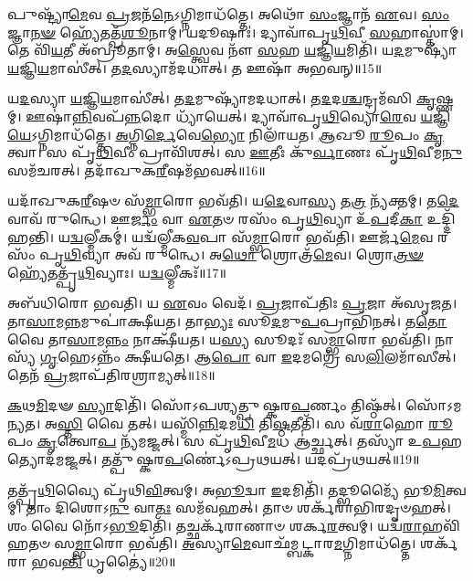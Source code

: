 𑌪𑍁𑌷𑍍𑌟𑍍𑌯𑌾᳴\-\ul{𑌮𑍇}\-𑌵 \ul{𑌪𑍍𑌰}\-𑌜𑌨᳴\-\ul{𑌨𑍇}\-\-𑌽𑌗𑍍𑌨𑌿𑌮𑌾𑌧᳴𑌤𑍍𑌤𑍇।
𑌅𑌥𑍋᳴ \ul{𑌸𑌂}\-𑌜𑍍𑌞𑌾𑌨᳴ \ul{𑌏}\-𑌵।
\-\ul{𑌸𑌂}\-𑌜𑍍𑌞𑌾\-\ul{𑌨}\-\-\ul{𑍟} 𑌹𑍍𑌯𑍇᳴𑌤𑌤𑍍𑌪᳴\-\ul{𑌶𑍂}\-𑌨𑌾𑌮𑍍।
𑌯𑌦𑍂𑌷𑌾𑌃॑।
𑌦𑍍𑌯𑌾𑌵𑌾᳴𑌪𑍃\-\ul{𑌥𑌿}\-𑌵𑍀 \ul{𑌸}\-𑌹𑌾𑌸𑍍𑌤𑌾॑𑌮𑍍।
𑌤𑍇 𑌵𑌿᳴\-\ul{𑌯}\-𑌤𑍀 𑌅᳴𑌬𑍍𑌰𑍂𑌤𑌾𑌮𑍍।
𑌅\-\ul{𑌸𑍍𑌤𑍍𑌵𑍇}\-𑌵 𑌨𑍗᳴ \ul{𑌸}\-𑌹 \ul{𑌯}\-𑌜𑍍𑌞𑌿\-\ul{𑌯}\-𑌮𑌿𑌤𑌿᳴।
𑌯\-\ul{𑌦}\-𑌮𑍁𑌷𑍍𑌯𑌾᳴ \ul{𑌯}\-𑌜𑍍𑌞𑌿\-\ul{𑌯}\-𑌮𑌾𑌸𑍀॑𑌤𑍍।
𑌤\-\ul{𑌦}\-𑌸𑍍𑌯𑌾𑌮᳴𑌦𑌧𑌾𑌤𑍍।
𑌤 𑌊𑌷𑌾᳴ 𑌅𑌭𑌵𑌨𑍍॥15॥

𑌯\-\ul{𑌦}\-𑌸𑍍𑌯𑌾 \ul{𑌯}\-𑌜𑍍𑌞𑌿\-\ul{𑌯}\-𑌮𑌾𑌸𑍀॑𑌤𑍍।
𑌤\-\ul{𑌦}\-𑌮𑍁𑌷𑍍𑌯𑌾᳴𑌮𑌦𑌧𑌾𑌤𑍍।
𑌤\-\ul{𑌦}\-𑌦\-\ul{𑌶𑍍𑌚}\-𑌨𑍍𑌦𑍍𑌰𑌮᳴𑌸𑌿 \ul{𑌕𑍃}\-𑌷𑍍𑌣𑌮𑍍।
𑌊𑌷𑌾॑\-\ul{𑌨𑍍𑌨𑌿}\-𑌵𑌪᳴\-\ul{𑌨𑍍𑌨}\-𑌦𑍋 𑌧𑍍𑌯𑌾᳴𑌯𑍇𑌤𑍍।
𑌦𑍍𑌯𑌾𑌵𑌾᳴𑌪𑍃\-\ul{𑌥𑌿}\-𑌵𑍍𑌯𑍋\-\ul{𑌰𑍇}\-𑌵 \ul{𑌯}\-𑌜𑍍𑌞𑌿\-\ul{𑌯𑍇}\-\-𑌽𑌗𑍍𑌨𑌿𑌮𑌾𑌧᳴𑌤𑍍𑌤𑍇।
\-\ul{𑌅}\-𑌗𑍍𑌨𑌿\-\ul{𑌰𑍍𑌦𑍇}\-𑌵𑍇\-\ul{𑌭𑍍𑌯𑍋} 𑌨𑌿𑌲𑌾᳴𑌯𑌤।
\-\ul{𑌆}\-𑌖𑍂 \ul{𑌰𑍂}\-𑌪𑌂 \ul{𑌕𑍃}\-𑌤𑍍𑌵𑌾।
𑌸 𑌪𑍃᳴\-\ul{𑌥𑌿}\-𑌵𑍀𑌂 𑌪𑍍𑌰𑌾𑌵𑌿᳴𑌶𑌤𑍍।
𑌸 \ul{𑌊}\-𑌤𑍀𑌃 𑌕𑍁᳴\-\ul{𑌰𑍍𑌵𑌾}\-𑌣𑌃 𑌪𑍃᳴\-\ul{𑌥𑌿}\-𑌵𑍀𑌮\-\ul{𑌨𑍁} 𑌸𑌮᳴𑌚𑌰𑌤𑍍।
𑌤𑌦𑌾᳴𑌖𑍁𑌕\-\ul{𑌰𑍀}\-𑌷𑌮᳴𑌭𑌵𑌤𑍍॥16॥

𑌯𑌦𑌾᳴𑌖𑍁𑌕\-\ul{𑌰𑍀}\-𑌷𑍞 𑌸᳴\-\ul{𑌮𑍍𑌭𑌾}\-𑌰𑍋 𑌭𑌵᳴𑌤𑌿।
𑌯\-\ul{𑌦𑍇}\-𑌵𑌾\-\ul{𑌸𑍍𑌯} 𑌤\-\ul{𑌤𑍍𑌰} 𑌨𑍍𑌯᳴𑌕𑍍𑌤𑌮𑍍।
𑌤\-\ul{𑌦𑍇}\-𑌵𑌾𑌵᳴ 𑌰𑍁𑌨𑍍𑌧𑍇।
𑌊\-\ul{𑌰𑍍𑌜𑌂} 𑌵𑌾 \ul{𑌏}\-𑌤𑍞 𑌰𑌸𑌂᳴ 𑌪𑍃\-\ul{𑌥𑌿}\-𑌵𑍍𑌯𑌾 𑌉᳴\-\ul{𑌪}\-𑌦𑍀\-\ul{𑌕𑌾} 𑌉𑌦𑍍𑌦𑌿᳴𑌹𑌨𑍍𑌤𑌿।
𑌯\-\ul{𑌦𑍍𑌵}\-𑌲𑍍𑌮𑍀𑌕𑌮𑍍॑।
𑌯𑌦𑍍𑌵᳴𑌲𑍍𑌮𑍀𑌕\-\ul{𑌵}\-𑌪𑌾 𑌸᳴\-\ul{𑌮𑍍𑌭𑌾}\-𑌰𑍋 𑌭𑌵᳴𑌤𑌿।
𑌊𑌰𑍍𑌜᳴\-\ul{𑌮𑍇}\-𑌵 𑌰𑌸𑌂᳴ 𑌪𑍃\-\ul{𑌥𑌿}\-𑌵𑍍𑌯𑌾 𑌅𑌵᳴ 𑌰𑍁𑌨𑍍𑌧𑍇।
𑌅\-\ul{𑌥𑍋} 𑌶𑍍𑌰𑍋𑌤𑍍𑌰᳴\-\ul{𑌮𑍇}\-𑌵।
𑌶𑍍𑌰𑍋\-\ul{𑌤𑍍𑌰}\-\-\ul{𑍟} 𑌹𑍍𑌯𑍇᳴𑌤𑌤𑍍𑌪𑍃᳴\-\ul{𑌥𑌿}\-𑌵𑍍𑌯𑌾𑌃।
𑌯\-\ul{𑌦𑍍𑌵}\-𑌲𑍍𑌮𑍀𑌕𑌃᳴॥17॥

𑌅𑌬᳴𑌧𑌿𑌰𑍋 𑌭𑌵𑌤𑌿।
𑌯 \ul{𑌏}\-𑌵𑌂 𑌵𑍇𑌦᳴।
\-\ul{𑌪𑍍𑌰}\-𑌜𑌾\-𑌪᳴𑌤𑌿𑌃 \ul{𑌪𑍍𑌰}\-𑌜𑌾 𑌅᳴\-𑌸𑍃𑌜𑌤।
𑌤𑌾\-\ul{𑌸𑌾}\-𑌮\-\ul{𑌨𑍍𑌨}\-𑌮𑍁𑌪𑌾॑𑌕𑍍𑌷𑍀𑌯𑌤।
𑌤𑌾\-\ul{𑌭𑍍𑌯𑌃} 𑌸𑍂\-\ul{𑌦}\-𑌮𑍁\-\ul{𑌪}\-𑌪𑍍𑌰𑌾𑌭𑌿᳴𑌨𑌤𑍍।
𑌤\-\ul{𑌤𑍋} 𑌵𑍈 𑌤𑌾\-\ul{𑌸𑌾}\-𑌮\-\ul{𑌨𑍍𑌨𑌂} 𑌨𑌾𑌕𑍍𑌷𑍀᳴𑌯𑌤।
𑌯\-\ul{𑌸𑍍𑌯} 𑌸𑍂𑌦𑌃᳴ 𑌸\-\ul{𑌮𑍍𑌭𑌾}\-𑌰𑍋 𑌭𑌵᳴𑌤𑌿।
𑌨𑌾𑌸𑍍𑌯᳴ \ul{𑌗𑍃}\-𑌹𑍇𑌽𑌨𑍍𑌨𑌂᳴ 𑌕𑍍𑌷𑍀𑌯𑌤𑍇।
𑌆\-\ul{𑌪𑍋} 𑌵𑌾 \ul{𑌇}\-𑌦𑌮𑌗𑍍𑌰𑍇᳴ 𑌸\-\ul{𑌲𑌿}\-𑌲𑌮𑌾᳴𑌸𑍀𑌤𑍍।
𑌤𑍇𑌨᳴ \ul{𑌪𑍍𑌰}\-𑌜𑌾𑌪᳴𑌤𑌿𑌰𑌶𑍍𑌰𑌾𑌮𑍍𑌯𑌤𑍍॥18॥

\-\ul{𑌕}\-𑌥\-\ul{𑌮𑌿}\-𑌦𑍟 \ul{𑌸𑍍𑌯𑌾}\-𑌦𑌿𑌤𑌿᳴।
𑌸𑍋᳴𑌽𑌪𑌶𑍍𑌯𑌤𑍍𑌪𑍁𑌷𑍍𑌕𑌰\-\ul{𑌪}\-𑌰𑍍𑌣𑌂 𑌤𑌿𑌷𑍍𑌠᳴𑌤𑍍।
𑌸𑍋᳴𑌽𑌮𑌨𑍍𑌯𑌤।
𑌅\-\ul{𑌸𑍍𑌤𑌿} 𑌵𑍈 𑌤𑌤𑍍।
𑌯𑌸𑍍𑌮𑌿᳴\-\ul{𑌨𑍍𑌨𑌿}\-𑌦𑌮\-\ul{𑌧𑌿} 𑌤𑌿\-\ul{𑌷𑍍𑌠}\-𑌤𑍀𑌤𑌿᳴।
𑌸 𑌵᳴\-\ul{𑌰𑌾}\-𑌹𑍋 \ul{𑌰𑍂}\-𑌪𑌂 \ul{𑌕𑍃}\-𑌤𑍍𑌵𑍋\-\ul{𑌪} 𑌨𑍍𑌯᳴𑌮𑌜𑍍𑌜𑌤𑍍।
𑌸 𑌪𑍃᳴\-\ul{𑌥𑌿}\-𑌵𑍀\-\ul{𑌮}\-𑌧 𑌆॑𑌰𑍍𑌚𑍍𑌛𑌤𑍍।
𑌤𑌸𑍍𑌯𑌾᳴ 𑌉\-\ul{𑌪}\-𑌹𑌤𑍍𑌯𑍋𑌦᳴𑌮𑌜𑍍𑌜𑌤𑍍।
𑌤𑌤𑍍𑌪𑍁᳴𑌷𑍍𑌕𑌰\-\ul{𑌪}\-𑌰𑍍𑌣𑍇॑\-𑌽𑌪𑍍𑌰𑌥𑌯𑌤𑍍।
𑌯𑌦𑌪𑍍𑌰᳴𑌥𑌯𑌤𑍍॥19॥

𑌤𑌤𑍍𑌪𑍃᳴\-\ul{𑌥𑌿}\-𑌵𑍍𑌯𑍈 𑌪𑍃᳴𑌥𑌿\-\ul{𑌵𑌿}\-𑌤𑍍𑌵𑌮𑍍।
𑌅\-\ul{𑌭𑍂}\-𑌦𑍍𑌵𑌾 \ul{𑌇}\-𑌦𑌮𑌿𑌤𑌿᳴।
𑌤𑌦𑍍𑌭𑍂𑌮𑍍𑌯𑍈᳴ 𑌭𑍂\-\ul{𑌮𑌿}\-𑌤𑍍𑌵𑌮𑍍।
𑌤𑌾𑌂 𑌦𑌿𑌶𑍋𑌽\-\ul{𑌨𑍁} 𑌵𑌾\-\ul{𑌤𑌃} 𑌸𑌮᳴𑌵𑌹𑌤𑍍।
𑌤𑌾𑍞 𑌶𑌰𑍍𑌕᳴𑌰𑌾𑌭𑌿𑌰𑌦𑍃𑍞𑌹𑌤𑍍।
𑌶𑌂 𑌵𑍈 𑌨𑍋᳴𑌽\-\ul{𑌭𑍂}\-𑌦𑌿𑌤𑌿᳴।
𑌤𑌚𑍍𑌛𑌰𑍍𑌕᳴𑌰𑌾𑌣𑌾𑍞 𑌶𑌰𑍍𑌕\-\ul{𑌰}\-𑌤𑍍𑌵𑌮𑍍।
𑌯𑌦𑍍𑌵᳴\-\ul{𑌰𑌾}\-𑌹𑌵𑌿᳴𑌹𑌤𑍞 𑌸\-\ul{𑌮𑍍𑌭𑌾}\-𑌰𑍋 𑌭𑌵᳴𑌤𑌿।
\-\ul{𑌅}\-𑌸𑍍𑌯𑌾\-\ul{𑌮𑍇}\-𑌵𑌾\-𑌛᳴𑌮𑍍𑌬𑌟𑍍𑌕𑌾𑌰\-\ul{𑌮}\-𑌗𑍍𑌨𑌿𑌮𑌾𑌧᳴𑌤𑍍𑌤𑍇।
𑌶𑌰𑍍𑌕᳴𑌰𑌾 𑌭𑌵\-\ul{𑌨𑍍𑌤𑌿} 𑌧𑍃𑌤𑍍𑌯𑍈॑॥20॥

